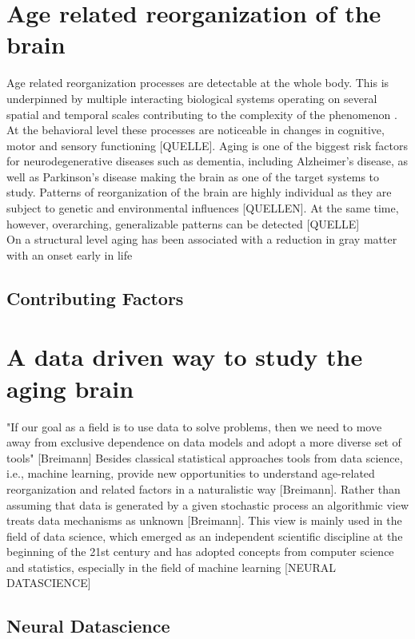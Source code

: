 \section{Age related reorganization of the brain}
Age related reorganization processes are detectable at the whole body. This is underpinned by multiple interacting biological systems operating on several spatial and temporal scales contributing to the complexity of the phenomenon \cite{Mooney2016}. At the behavioral level these processes are noticeable in changes in cognitive, motor and sensory functioning [QUELLE]. Aging is one of the biggest risk factors for neurodegenerative diseases such as dementia, including Alzheimer's disease, as well as Parkinson's disease making the brain as one of the target systems to study. Patterns of reorganization of the brain are highly individual as they are subject to genetic and environmental influences [QUELLEN]. At the same time, however, overarching, generalizable patterns can be detected [QUELLE]\\
On a structural level aging has been associated with a reduction in gray matter with an onset early in life 

\subsection{Contributing Factors}

\section{A data driven way to study the aging brain}
"If our goal as a field is to use data to solve problems, then we need to move away from exclusive dependence on data models and adopt a more diverse set of tools" [Breimann] 
Besides classical statistical approaches tools from data science, i.e., machine learning, provide new opportunities to understand age-related reorganization and related factors in a naturalistic way [Breimann]. Rather than assuming that data is generated by a given stochastic process an algorithmic view treats data mechanisms as unknown [Breimann]. This view is mainly used in the field of data science, which emerged as an independent scientific discipline at the beginning of the 21st century and has adopted concepts from computer science and statistics, especially in the field of machine learning [NEURAL DATASCIENCE] 

\subsection{Neural Datascience}



